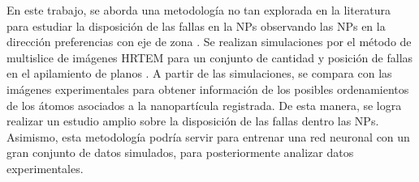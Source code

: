 En este trabajo, se aborda una metodología no tan explorada en la literatura para estudiar la disposición de las fallas en la NPs observando las NPs en la dirección preferencias con eje de zona \hkl[111].
Se realizan simulaciones por el método de multislice de imágenes HRTEM para un conjunto de cantidad y posición de fallas en el apilamiento de planos .
A partir de las simulaciones, se compara con las imágenes experimentales para obtener información de los posibles ordenamientos de los átomos asociados a la nanopartícula registrada.
De esta manera, se logra realizar un estudio amplio sobre la disposición de las fallas dentro las NPs. Asimismo, esta metodología podría servir para entrenar una red neuronal con un gran conjunto de datos simulados, para posteriormente analizar datos experimentales.